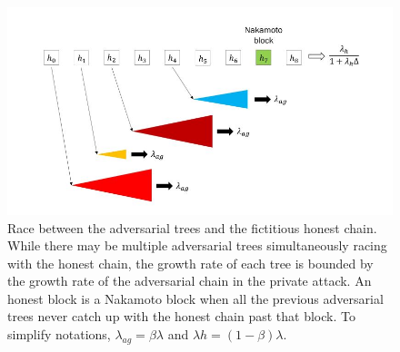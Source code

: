 \begin{figure}[h!]
    \centering
    \includegraphics[width=0.6\linewidth]{Fig/06/F7}
    \caption{Race between the adversarial trees and the fictitious honest chain. While there may be multiple adversarial trees simultaneously racing with the honest chain, the growth rate of each tree is bounded by the growth rate of the adversarial chain in the private attack. An honest block is a Nakamoto block when all the previous adversarial trees never catch up with the honest chain past that block. To simplify notations, $\lambda_{ag} = \beta\lambda$ and $\lambda h = (1 − \beta)\lambda$.}
    \label{fig:f7}
\end{figure}

